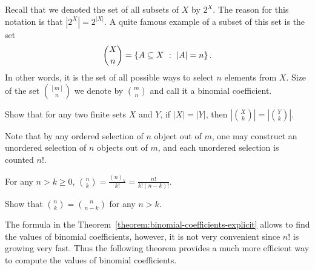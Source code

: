 Recall that we denoted the set of all subsets of $X$ by $2^X$. The reason for
this notation is that $|2^X| = 2^{|X|}$. A quite famous example of a subset of
this set is the set
\[
  \binom{X}{n} = \set[|A| = n]{A \subseteq X}.
\]
In other words, it is the set of all possible ways to select $n$ elements from
$X$. Size of the set $\binom{[m]}{n}$ we denote by $\binom{m}{n}$ and call it a
binomial coefficient.
\begin{exercise}
  Show that for any two finite sets $X$ and $Y$, if $|X| = |Y|$, then
  $\left|\binom{X}{k}\right| = \left|\binom{Y}{k}\right|$.
\end{exercise}

Note that by any ordered selection of $n$ object out of $m$, one may construct
an unordered selection of $n$ objects out of $m$, and each unordered selection
is counted $n!$.
\begin{theorem}
\label{theorem:binomial-coefficients-explicit}
  For any $n > k \ge 0$,
  $\binom{n}{k} = \frac{(n)_k}{k!} = \frac{n!}{k!  (n - k)!}$.
\end{theorem}

\begin{exercise}
  Show that $\binom{n}{k} = \binom{n}{n - k}$ for any $n > k$.
\end{exercise}

The formula in the Theorem~\ref{theorem:binomial-coefficients-explicit} allows
to find the values of binomial coefficients, however, it is not very convenient
since $n!$ is growing very fast. Thus the following theorem provides a much more
efficient way to compute the values of binomial coefficients.

